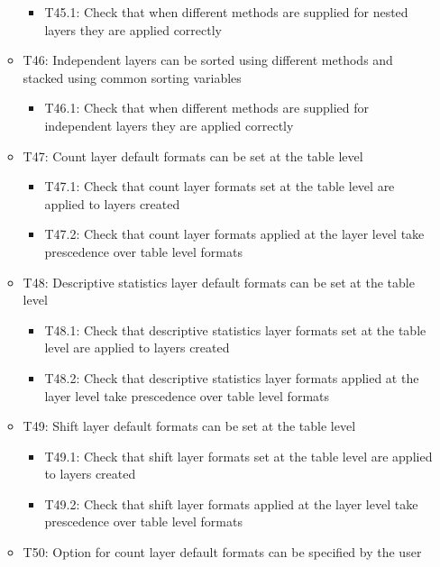 \documentclass[
]{article}
\providecommand{\tightlist}{%
  \setlength{\itemsep}{0pt}\setlength{\parskip}{0pt}}
\begin{document}
\begin{itemize}
\begin{itemize}
    \begin{itemize}
    \tightlist
    \item
      T45.1: Check that when different methods are supplied for nested
      layers they are applied correctly
    \end{itemize}
  \item
    T46: Independent layers can be sorted using different methods and
    stacked using common sorting variables

    \begin{itemize}
    \tightlist
    \item
      T46.1: Check that when different methods are supplied for
      independent layers they are applied correctly
    \end{itemize}
  \item
    T47: Count layer default formats can be set at the table level

    \begin{itemize}
    \tightlist
    \item
      T47.1: Check that count layer formats set at the table level are
      applied to layers created
    \item
      T47.2: Check that count layer formats applied at the layer level
      take prescedence over table level formats
    \end{itemize}
  \item
    T48: Descriptive statistics layer default formats can be set at the
    table level

    \begin{itemize}
    \tightlist
    \item
      T48.1: Check that descriptive statistics layer formats set at the
      table level are applied to layers created
    \item
      T48.2: Check that descriptive statistics layer formats applied at
      the layer level take prescedence over table level formats
    \end{itemize}
  \item
    T49: Shift layer default formats can be set at the table level

    \begin{itemize}
    \tightlist
    \item
      T49.1: Check that shift layer formats set at the table level are
      applied to layers created
    \item
      T49.2: Check that shift layer formats applied at the layer level
      take prescedence over table level formats
    \end{itemize}
  \item
    T50: Option for count layer default formats can be specified by the
    user


\end{itemize}
\end{itemize}
\end{document}
